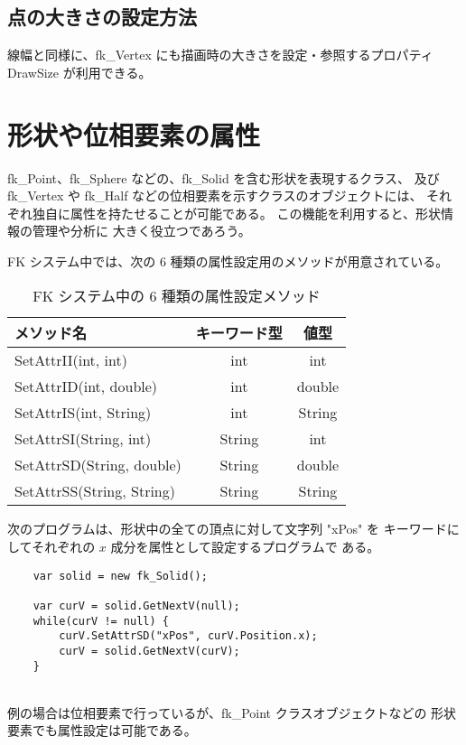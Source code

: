 \subsection{点の大きさの設定方法}
線幅と同様に、fk\_Vertex にも描画時の大きさを設定・参照するプロパティ
DrawSize が利用できる。

\section{形状や位相要素の属性} \label{sec:userattr}
fk\_Point、fk\_Sphere などの、fk\_Solid を含む形状を表現するクラス、
及び fk\_Vertex や fk\_Half などの位相要素を示すクラスのオブジェクトには、
それぞれ独自に属性を持たせることが可能である。
この機能を利用すると、形状情報の管理や分析に
大きく役立つであろう。

FK システム中では、次の 6 種類の属性設定用のメソッドが用意されている。

\begin{table}[H]
\caption{FK システム中の 6 種類の属性設定メソッド}
\label{tbl:attr1}
\begin{center}
\begin{tabular}{|l|c|c|}
\hline
メソッド名 & キーワード型 & 値型 \\ \hline \hline
SetAttrII(int, int) & int & int \\ \hline
SetAttrID(int, double) & int & double \\ \hline
SetAttrIS(int, String) & int & String \\ \hline
SetAttrSI(String, int) & String & int \\ \hline
SetAttrSD(String, double) & String & double \\ \hline
SetAttrSS(String, String) & String & String \\ \hline
\end{tabular}
\end{center}
\end{table}

次のプログラムは、形状中の全ての頂点に対して文字列 "xPos" を
キーワードにしてそれぞれの \(x\) 成分を属性として設定するプログラムで
ある。
\\
\begin{breakbox}
\begin{verbatim}
    var solid = new fk_Solid();

    var curV = solid.GetNextV(null);
    while(curV != null) {
        curV.SetAttrSD("xPos", curV.Position.x);
        curV = solid.GetNextV(curV);
    }
\end{verbatim}
\end{breakbox}
~ \\
例の場合は位相要素で行っているが、fk\_Point クラスオブジェクトなどの
形状要素でも属性設定は可能である。

